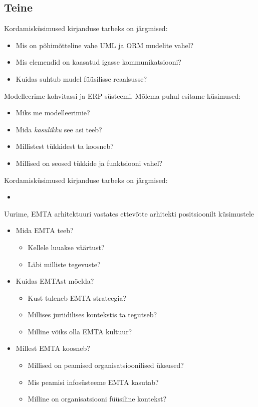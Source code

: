 \documentclass[nobib]{tufte-handout}
\begin{document}
\subsection{Teine}
Kordamisküsimused kirjanduse tarbeks on järgmised:
\begin{itemize}
	\item Mis on põhimõtteline vahe UML ja ORM mudelite vahel?
	\item Mis elemendid on kaasatud igasse kommunikatsiooni?
	\item Kuidas suhtub mudel füüsilisse reaalsusse?
\end{itemize}

Modelleerime kohvitassi ja ERP süsteemi. Mõlema puhul esitame küsimused:
\begin{itemize}
	\item Miks me modelleerimie?
	\item Mida \emph{kasulikku} see asi teeb?
	\item Millistest tükkidest ta koosneb?
	\item Millised on seosed tükkide ja funktsiooni vahel?
\end{itemize}

Kordamisküsimused kirjanduse tarbeks on järgmised:
\begin{itemize}
	\item 
\end{itemize}

Uurime, EMTA arhitektuuri vastates ettevõtte arhitekti positsioonilt küsimustele
\begin{itemize}
	\item Mida EMTA teeb?
	\begin{itemize}
		\item Kellele luuakse väärtust?
		\item Läbi milliste tegevuste?
	\end{itemize}
	\item Kuidas EMTAst mõelda?
	\begin{itemize}
		\item Kust tuleneb EMTA strateegia?
		\item Millises juriidilises kontekstis ta tegutseb?
		\item Milline võiks olla EMTA kultuur?
	\end{itemize}
	\item Millest EMTA koosneb?
	\begin{itemize}
		\item Millised on peamised organisatsioonilised üksused?
		\item Mis peamisi infosüsteeme EMTA kasutab?
		\item Milline on organisatsiooni füüsiline kontekst?
	\end{itemize}
\end{itemize}
\end{document}
